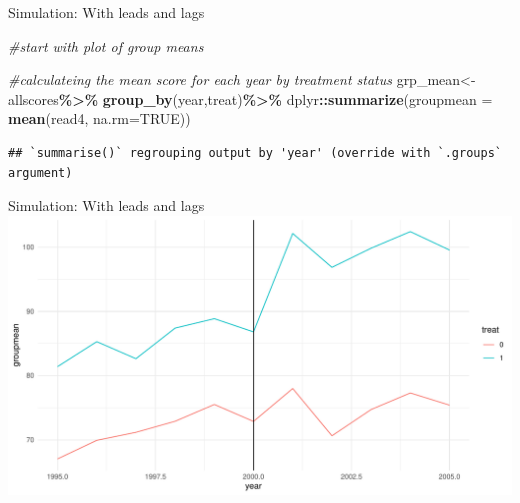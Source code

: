 \documentclass[
  ignorenonframetext,
]{beamer}
\newenvironment{Shaded}{\begin{snugshade}}{\end{snugshade}}
\newcommand{\CommentTok}[1]{\textcolor[rgb]{0.56,0.35,0.01}{\textit{#1}}}
\newcommand{\DataTypeTok}[1]{\textcolor[rgb]{0.13,0.29,0.53}{#1}}
\newcommand{\DecValTok}[1]{\textcolor[rgb]{0.00,0.00,0.81}{#1}}
\newcommand{\KeywordTok}[1]{\textcolor[rgb]{0.13,0.29,0.53}{\textbf{#1}}}
\newcommand{\NormalTok}[1]{#1}
\newcommand{\OperatorTok}[1]{\textcolor[rgb]{0.81,0.36,0.00}{\textbf{#1}}}
\newcommand{\OtherTok}[1]{\textcolor[rgb]{0.56,0.35,0.01}{#1}}
\newcommand{\StringTok}[1]{\textcolor[rgb]{0.31,0.60,0.02}{#1}}
\begin{document}
\begin{frame}[fragile]{Simulation: With leads and lags}
\protect\hypertarget{simulation-with-leads-and-lags-4}{}
\tiny

\begin{Shaded}
\begin{Highlighting}[]
\CommentTok{\#start with plot of group means}

\CommentTok{\#calculateing the mean score for each year by treatment status}
\NormalTok{grp\_mean\textless{}{-}allscores}\OperatorTok{\%\textgreater{}\%}
\StringTok{    }\KeywordTok{group\_by}\NormalTok{(year,treat)}\OperatorTok{\%\textgreater{}\%}
\StringTok{    }\NormalTok{dplyr}\OperatorTok{::}\KeywordTok{summarize}\NormalTok{(}\DataTypeTok{groupmean =} \KeywordTok{mean}\NormalTok{(read4, }\DataTypeTok{na.rm=}\OtherTok{TRUE}\NormalTok{))}
\end{Highlighting}
\end{Shaded}

\begin{verbatim}
## `summarise()` regrouping output by 'year' (override with `.groups` argument)
\end{verbatim}

\begin{Shaded}
\end{Shaded}
\end{frame}

\begin{frame}{Simulation: With leads and lags}
\protect\hypertarget{simulation-with-leads-and-lags-5}{}
\includegraphics{"Slides_DID_files/figure-beamer/didplot-1.pdf"}
\end{frame}
\end{document}
